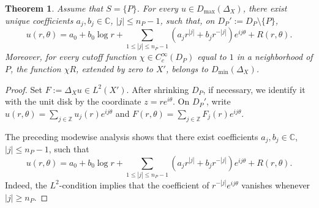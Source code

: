 \documentclass[12pt]{amsart}
\theoremstyle{plain}
\newtheorem{thm}{Theorem}[section]
\theoremstyle{definition}
\theoremstyle{remark}
\numberwithin{equation}{section} \numberwithin{figure}{section}
\begin{document}
\begin{thm}\label{thm:asymptotic-expansion}
Assume that \(S=\{P\}\). For every \(u\in D_{\max}(\Delta_X)\), there
exist unique coefficients \(a_j,b_j\in\mathbb C\),
\(|j|\leq n_P-1\), such that, on \(D_P':=D_P\setminus\{P\}\),
\[
u(r,\theta)
=
a_0+b_0\log r
+
\sum_{1\leq |j|\leq n_P-1}
\left(
a_jr^{|j|}+b_jr^{-|j|}
\right)e^{ij\theta}
+
R(r,\theta).
\]
Moreover, for every cutoff function \(\chi\in C_c^\infty(D_P)\) equal
to \(1\) in a neighborhood of \(P\), the function \(\chi R\), extended
by zero to \(X'\), belongs to \(D_{\min}(\Delta_X)\).
\end{thm}
\begin{proof}
Set \(F:=\Delta_Xu\in L^2(X')\). After shrinking \(D_P\), if necessary,
we identify it with the unit disk by the coordinate \(z=re^{i\theta}\).
On \(D_P'\), write
\(u(r,\theta)=\sum_{j\in\mathbb Z}u_j(r)e^{ij\theta}\) and
\(F(r,\theta)=\sum_{j\in\mathbb Z}F_j(r)e^{ij\theta}\).

The preceding modewise analysis shows that there exist coefficients
\(a_j,b_j\in\mathbb C\), \(|j|\leq n_P-1\), such that
\[
u(r,\theta)
=
a_0+b_0\log r
+
\sum_{1\leq |j|\leq n_P-1}
\left(
a_jr^{|j|}+b_jr^{-|j|}
\right)e^{ij\theta}
+
R(r,\theta).
\]
Indeed, the \(L^2\)-condition implies that the coefficient of
\(r^{-|j|}e^{ij\theta}\) vanishes whenever \(|j|\geq n_P\).


\end{proof}
\end{document}
